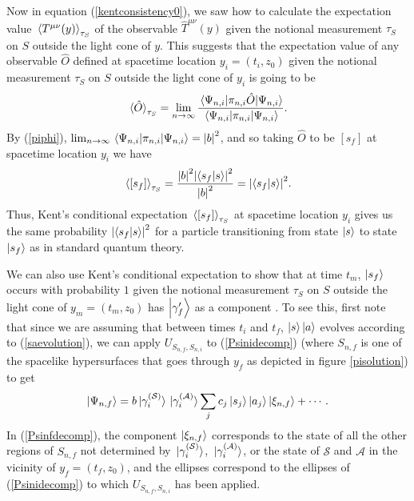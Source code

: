 Now in equation (\ref{kentconsistency0}), we saw how to calculate the expectation value $\ev*{T^{\mu\nu}(y)}_{\tau_S}$ of the observable $\hat{T}^{\mu\nu}(y)$ given the notional measurement $\tau_S$ on $S$ outside the light cone of $y$. This suggests that the expectation value of any observable $\hat{O}$ defined at spacetime location $y_i=(t_i,z_0)$ given the notional measurement $\tau_S$ on $S$ outside the light cone of $y_i$ is going to be
\begin{equation}\label{kentevo}
\ev*{\hat{O}}_{\tau_S}=\lim_{n\rightarrow\infty}\frac{\ev*{\pi_{n,i}\hat{O}}{\Psi_{n,i}}}{\ev*{\pi_{n,i}}{\Psi_{n,i}}}.
\end{equation}
By (\ref{piphi}), $\lim_{n\rightarrow\infty}\ev*{\pi_{n,i}}{\Psi_{n,i}}=\abs{b}^2$, and so taking $\hat{O}$ to be $[s_f]$ at spacetime location $y_i$ we have 
$$ \ev*{[s_f]}_{\tau_S}=\frac{\abs{b}^2\abs{\ip{s_f}{s}}^2}{\abs{b}^2}=\abs{\ip{s_f}{s}}^2.$$
Thus, Kent's conditional expectation $\ev*{[s_f]}_{\tau_S}$ at spacetime location $y_i$ gives us the same probability $\abs{\ip{s_f}{s}}^2$ for a particle transitioning from state $\ket{s}$ to state $\ket{s_f}$ as in standard quantum theory.

We can also use Kent's conditional expectation to show that at time $t_m$, $\ket{s_f}$ occurs with probability $1$ given the notional measurement $\tau_S$ on $S$ outside the light cone of $y_m=(t_m,z_0)$ has $\ket{\gamma_f'}$ as a component . To see this, first note that since we are assuming that between times $t_i$ and $t_f$, $\ket{s}\ket{a}$ evolves according to (\ref{saevolution}), we can apply $U_{S_{n,f},S_{n,i}}$ to (\ref{Psinidecomp}) (where $S_{n,f}$ is one of the spacelike hypersurfaces that goes through $y_f$ as depicted in figure \ref{pisolution}) to get
\begin{equation}\label{Psinfdecomp}
	\ket{\Psi_{n,f}}=b\ket*{\gamma_i^{(\mathcal{S})}}\ket*{\gamma_i^{(\mathcal{A})}}\sum_j c_j \ket{s_j}\ket{a_j}\ket{\xi_{n,f}}+\cdots.
	\end{equation} 
In (\ref{Psinfdecomp}), the component $\ket{\xi_{n,f}}$ corresponds to the state of all the other regions of $S_{n,f}$ not determined by $\ket*{\gamma_i^{(\mathcal{S})}}$, $\ket*{\gamma_i^{(\mathcal{A})}}$, or the state of $\mathcal{S}$ and $\mathcal{A}$ in the vicinity of $y_f=(t_f, z_0)$, and the ellipses correspond to the ellipses of (\ref{Psinidecomp}) to which $U_{S_{n,f},S_{n,i}}$ has been applied. 

